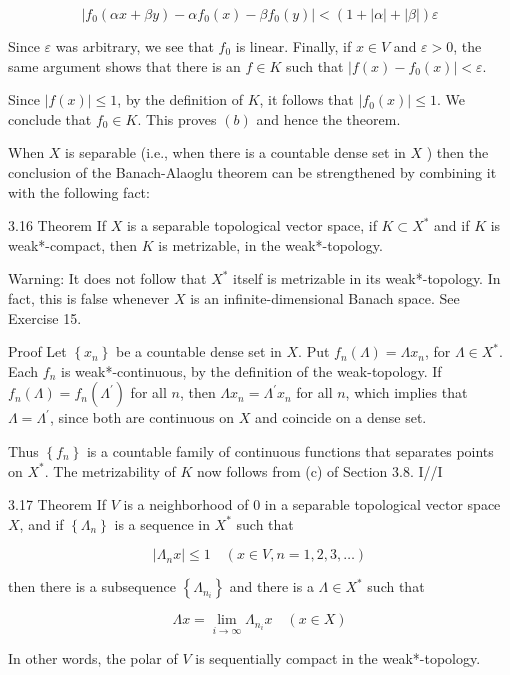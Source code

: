 \documentclass[10pt]{article}
\begin{document}
$$
\left|f_{0}(\alpha x+\beta y)-\alpha f_{0}(x)-\beta f_{0}(y)\right|<(1+|\alpha|+|\beta|) \varepsilon
$$

Since $\varepsilon$ was arbitrary, we see that $f_{0}$ is linear. Finally, if $x \in V$ and $\varepsilon>0$, the same argument shows that there is an $f \in K$ such that $\left|f(x)-f_{0}(x)\right|<\varepsilon$.

Since $|f(x)| \leq 1$, by the definition of $K$, it follows that $\left|f_{0}(x)\right| \leq 1$. We conclude that $f_{0} \in K$. This proves $(b)$ and hence the theorem.

When $X$ is separable (i.e., when there is a countable dense set in $X$ ) then the conclusion of the Banach-Alaoglu theorem can be strengthened by combining it with the following fact:

3.16 Theorem If $X$ is a separable topological vector space, if $K \subset X^{*}$ and if $K$ is weak*-compact, then $K$ is metrizable, in the weak*-topology.

Warning: It does not follow that $X^{*}$ itself is metrizable in its weak*-topology. In fact, this is false whenever $X$ is an infinite-dimensional Banach space. See Exercise 15.

Proof Let $\left\{x_{n}\right\}$ be a countable dense set in $X$. Put $f_{n}(\Lambda)=\Lambda x_{n}$, for $\Lambda \in X^{*}$. Each $f_{n}$ is weak*-continuous, by the definition of the weak-topology. If $f_{n}(\Lambda)=f_{n}\left(\Lambda^{\prime}\right)$ for all $n$, then $\Lambda x_{n}=\Lambda^{\prime} x_{n}$ for all $n$, which implies that $\Lambda=\Lambda^{\prime}$, since both are continuous on $X$ and coincide on a dense set.

Thus $\left\{f_{n}\right\}$ is a countable family of continuous functions that separates points on $X^{*}$. The metrizability of $K$ now follows from (c) of Section 3.8. I//I

3.17 Theorem If $V$ is a neighborhood of 0 in a separable topological vector space $X$, and if $\left\{\Lambda_{n}\right\}$ is a sequence in $X^{*}$ such that

$$
\left|\Lambda_{n} x\right| \leq 1 \quad(x \in V, n=1,2,3, \ldots)
$$

then there is a subsequence $\left\{\Lambda_{n_{i}}\right\}$ and there is a $\Lambda \in X^{*}$ such that

$$
\Lambda x=\lim _{i \rightarrow \infty} \Lambda_{n_{i}} x \quad(x \in X)
$$

In other words, the polar of $V$ is sequentially compact in the weak*-topology.
\end{document}
